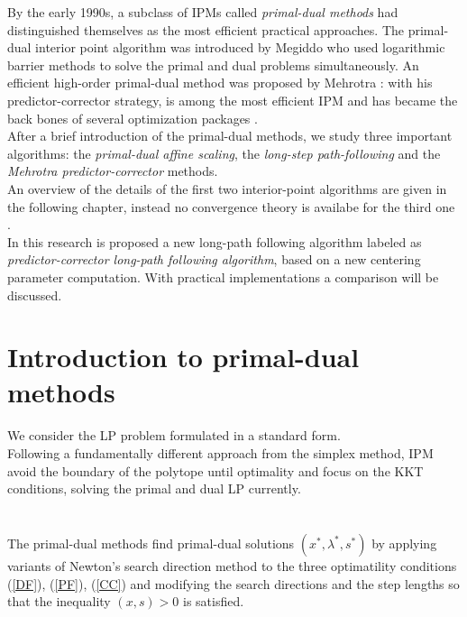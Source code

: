 \documentclass[a4paper,10 pt,titlepage,twoside]{book}
\theoremstyle{plain}
\theoremstyle{definition}
\theoremstyle{remark}
\begin{document}
By the early 1990s, a subclass of IPMs called \textit{primal-dual methods} had distinguished themselves as the most efficient practical approaches. The primal-dual interior point algorithm was introduced by Megiddo \cite{meg} who used logarithmic barrier methods to solve
the primal and dual problems simultaneously. An efficient
high-order primal-dual method was proposed by Mehrotra \cite{MER}: with his  predictor-corrector
strategy, is among the most efficient IPM and has became the back bones
of several optimization packages \cite{matlab}.\\ 
After a brief introduction of the primal-dual methods, we study three important algorithms: the \textit{primal-dual affine scaling}, the \textit{long-step path-following} and the \textit{Mehrotra predictor-corrector} methods.\\
An overview of the details of the first two interior-point algorithms are given in the following chapter, instead no convergence theory is availabe for the third one . \\
In this research is proposed a new long-path following algorithm labeled as \textit{predictor-corrector long-path following algorithm}, based on a new centering parameter computation. With practical implementations a comparison will be discussed.

\newpage
\section{Introduction to primal-dual methods}
We consider the LP problem formulated in a standard form. \\
Following a fundamentally different approach from the simplex method, IPM avoid the boundary of the polytope until optimality and focus on the KKT conditions, solving the primal and dual LP currently.\\
\\
\\
The primal-dual methods find primal-dual solutions $(x^{*},\lambda^{*},s^{*})$ by applying variants of Newton's search direction method to the three optimatility conditions (\ref{DF}), (\ref{PF}), (\ref{CC}) and modifying the search directions and the step lengths so that the inequality $(x,s)>0$ is satisfied.\\
\end{document}
